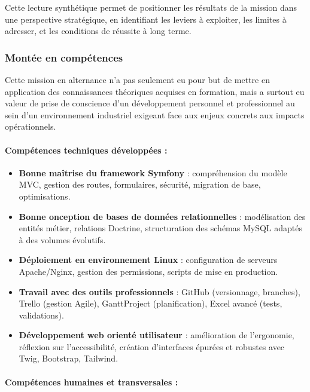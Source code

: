 \documentclass[11pt,a4paper]{article}
\begin{document}
Cette lecture synthétique permet de positionner les résultats de la mission dans une perspective stratégique, en identifiant les leviers à exploiter, les limites à adresser, et les conditions de réussite à long terme.

\subsubsection{Montée en compétences}

Cette mission en alternance n’a pas seulement eu pour but de mettre en application des connaissances théoriques acquises en formation, mais a surtout eu valeur de prise de conscience d’un développement personnel et professionnel au sein d’un environnement industriel exigeant face aux enjeux concrets aux impacts opérationnels.

\paragraph{Compétences techniques développées :}

\begin{itemize}
    \item \textbf{Bonne maîtrise du framework Symfony} : compréhension du modèle MVC, gestion des routes, formulaires, sécurité, migration de base, optimisations.
    
    \item \textbf{Bonne onception de bases de données relationnelles} : modélisation des entités métier, relations Doctrine, structuration des schémas MySQL adaptés à des volumes évolutifs.

    \item \textbf{Déploiement en environnement Linux} : configuration de serveurs Apache/Nginx, gestion des permissions, scripts de mise en production.

    \item \textbf{Travail avec des outils professionnels} : GitHub (versionnage, branches), Trello (gestion Agile), GanttProject (planification), Excel avancé (tests, validations).

    \item \textbf{Développement web orienté utilisateur} : amélioration de l’ergonomie, réflexion sur l’accessibilité, création d’interfaces épurées et robustes avec Twig, Bootstrap, Tailwind.
\end{itemize}

\paragraph{Compétences humaines et transversales :}
\end{document}
